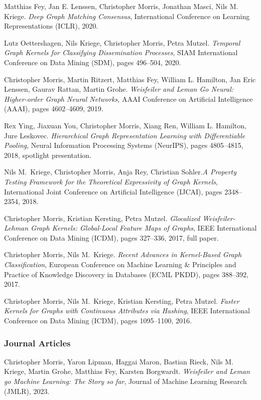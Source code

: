 \documentclass[10pt, a4paper, DIV=14, headings=small]{scrartcl}
\begin{document}
\begin{thebibliography}{15}
	Matthias Fey, Jan E. Lenssen, Christopher Morris, Jonathan Masci, Nils M. Kriege.
	\emph{Deep Graph Matching Consensus},
	International Conference on Learning Representations (ICLR), 2020.

	Lutz Oettershagen, Nils Kriege, Christopher Morris, Petra Mutzel.
	\emph{Temporal Graph Kernels for Classifying Dissemination Processes},
	SIAM International Conference on Data Mining (SDM), pages 496--504, 2020.

	Christopher Morris, Martin Ritzert, Matthias Fey, William L. Hamilton, Jan Eric Lenssen, Gaurav Rattan, Martin Grohe.
	\newblock \emph{Weisfeiler and Leman Go Neural: Higher-order Graph Neural Networks},
	\newblock AAAI Conference on Artificial Intelligence (AAAI), pages 4602--4609, 2019.

	Rex Ying, Jiaxuan You, Christopher Morris, Xiang Ren, William L. Hamilton, Jure Leskovec.
	\emph{Hierarchical Graph Representation Learning with Differentiable Pooling},
	Neural Information Processing Systems (NeurIPS), pages 4805--4815, 2018, spotlight presentation.

	Nils M.~Kriege, Christopher Morris, Anja Rey, Christian Sohler.\footnotemark[2]
	\emph{A Property Testing Framework for the Theoretical Expressivity of Graph Kernels},
	International Joint Conference on Artificial Intelligence (IJCAI), pages 2348--2354, 2018.

	Christopher Morris, Kristian Kersting, Petra Mutzel.
	\emph{Glocalized Weisfeiler-Lehman Graph Kernels: Global-Local Feature Maps of Graphs},
	IEEE International Conference on Data Mining (ICDM), pages 327--336, 2017, full paper.

	Christopher Morris, Nils M.~Kriege.
	\emph{Recent Advances in Kernel-Based Graph Classification},
	European Conference on Machine Learning \& Principles and Practice of Knowledge Discovery in Databases (ECML PKDD), pages 388--392, 2017.

	Christopher Morris, Nils M.~Kriege, Kristian Kersting, Petra Mutzel.
	\emph{Faster Kernels for Graphs with Continuous Attributes via Hashing},
	IEEE International Conference on Data Mining (ICDM), pages 1095--1100, 2016.
	
	\subsubsection*{Journal Articles}
	Christopher Morris, Yaron Lipman, Haggai Maron, Bastian Rieck, Nils M. Kriege, Martin Grohe, Matthias Fey, Karsten Borgwardt.
	\emph{Weisfeiler and Leman go Machine Learning: The Story so far}, Journal of Machine Learning Research (JMLR), 2023.


\end{thebibliography}
\end{document}

